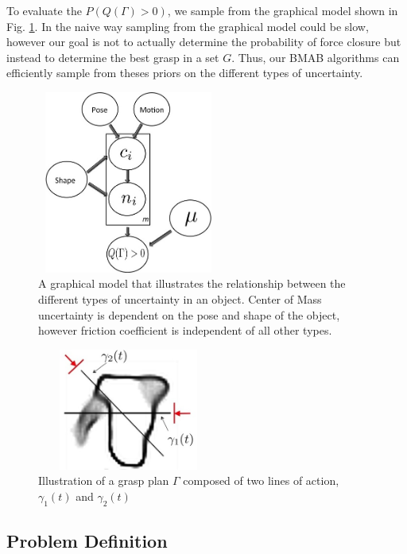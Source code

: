 \documentclass[journal,transmag]{IEEEtran}%
\begin{document}
 
To evaluate the $P(Q(\Gamma)>0)$, we sample from the graphical model shown in Fig. \ref{fig:graphical_model}. In the naive way sampling from the graphical model could be slow, however our goal is not to actually determine the probability of force closure but instead to determine the best grasp in a set $G$. Thus, our BMAB algorithms can efficiently sample from theses priors on the different types of uncertainty.  
 
 
 



\begin{figure}[ht!]
\centering
\includegraphics[width = 6cm, height = 6cm]{figures/Slide8.jpg}
\caption{A graphical model that illustrates the relationship between the different types of uncertainty in an object. Center of Mass uncertainty is dependent on the pose and shape of the object, however friction coefficient is independent of all other types. }
\vspace*{-10pt}
\label{fig:graphical_model}
\end{figure}


\begin{figure}[ht!]
\centering
\includegraphics[width = 6cm, height = 4cm]{figures/Slide01.jpg}
\caption{Illustration of a grasp plan $\Gamma$ composed of two lines of action, $\gamma_1(t)$ and $\gamma_2(t)$}
\vspace*{-10pt}
\label{fig:line_of_action}
\end{figure}


\subsection{Problem Definition}
\end{document}
